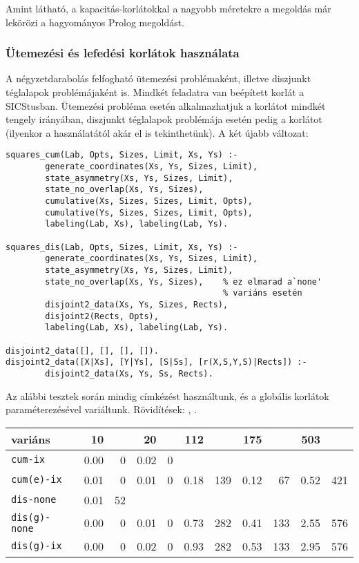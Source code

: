 Amint látható, a kapacitás-korlátokkal a nagyobb méretekre a \clpfd megoldás már
lekörözi a hagyományos Prolog megoldást.

\subsubsection{Ütemezési és lefedési korlátok használata}

A négyzetdarabolás felfogható ütemezési problémaként, illetve diszjunkt téglalapok
problémájaként is. Mindkét feladatra van beépített korlát a SICStusban. Ütemezési
probléma esetén alkalmazhatjuk a  korlátot mindkét tengely irányában,
diszjunkt téglalapok problémája esetén pedig a  korlátot (ilyenkor a
 használatától akár el is tekinthetünk).
\br
A két újabb változat:

\begin{verbatim}
squares_cum(Lab, Opts, Sizes, Limit, Xs, Ys) :-
        generate_coordinates(Xs, Ys, Sizes, Limit),
        state_asymmetry(Xs, Ys, Sizes, Limit),
        state_no_overlap(Xs, Ys, Sizes),   
        cumulative(Xs, Sizes, Sizes, Limit, Opts),
        cumulative(Ys, Sizes, Sizes, Limit, Opts),
        labeling(Lab, Xs), labeling(Lab, Ys).

squares_dis(Lab, Opts, Sizes, Limit, Xs, Ys) :-
        generate_coordinates(Xs, Ys, Sizes, Limit),
        state_asymmetry(Xs, Ys, Sizes, Limit),
        state_no_overlap(Xs, Ys, Sizes),    % ez elmarad a`none' 
                                            % variáns esetén
        disjoint2_data(Xs, Ys, Sizes, Rects),
        disjoint2(Rects, Opts),
        labeling(Lab, Xs), labeling(Lab, Ys).

disjoint2_data([], [], [], []).
disjoint2_data([X|Xs], [Y|Ys], [S|Ss], [r(X,S,Y,S)|Rects]) :-
        disjoint2_data(Xs, Ys, Ss, Rects).
\end{verbatim}

Az alábbi tesztek során mindig \cd{[min]} címkézést használtunk, és a globális
korlátok paraméterezésével variáltunk. Rövidítések: ,
.

\begin{center}
\begin{tabular}{|l|rr|rr|rr|rr|rr|}
\hline
variáns   & 10     &      &  20   &      & 112    &      & 175   &    & 503  &\\
\hline
{\tt cum-ix}      &  0.00&    0&  0.02&    0&       &     &       &     &       &     \\
{\tt cum(e)-ix}   &  0.01&    0&  0.01&    0&  0.18&  139&  0.12&   67&  0.52&  421\\
\hline
{\tt dis-none}    &  0.01&   52&       &     &       &     &       &     &       &     \\
{\tt dis(g)-none} &  0.00&    0&  0.01&    0&  0.73&  282&  0.41&  133&  2.55&  576\\
{\tt dis(g)-ix}   &  0.00&    0&  0.02&    0&  0.93&  282&  0.53&  133&  2.95&  576\\
\hline
\end{tabular}
\end{center}

